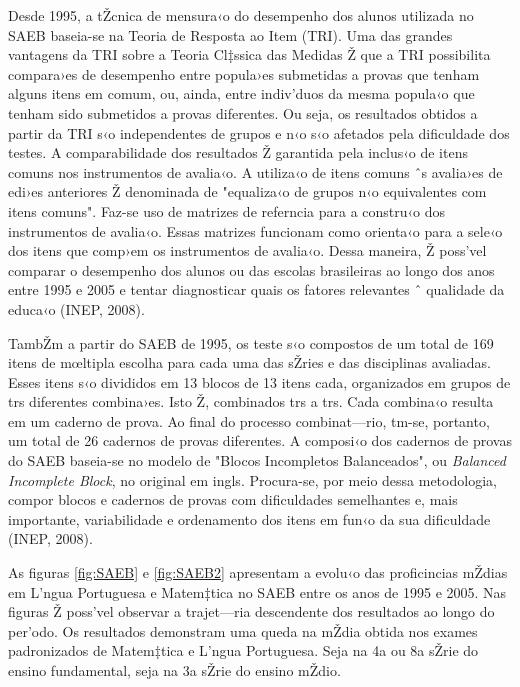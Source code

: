 \documentclass[a4paper, 12pt]{article}
\begin{document}
Desde 1995, a tŽcnica de mensura‹o do desempenho dos alunos utilizada no SAEB baseia-se na Teoria de Resposta ao Item (TRI). Uma das grandes vantagens da TRI sobre a Teoria Cl‡ssica das Medidas Ž que a TRI possibilita compara›es de desempenho entre popula›es submetidas a provas que tenham alguns itens em comum, ou, ainda, entre indiv’duos da mesma popula‹o que tenham sido submetidos a provas diferentes. Ou seja, os resultados obtidos a partir da TRI s‹o independentes de grupos e n‹o s‹o afetados pela dificuldade dos testes. A comparabilidade dos resultados Ž garantida pela inclus‹o de itens comuns nos instrumentos de avalia‹o. A utiliza‹o de itens comuns ˆs avalia›es de edi›es anteriores Ž denominada de "equaliza‹o de grupos n‹o equivalentes com itens comuns". Faz-se uso de matrizes de referncia para a constru‹o dos instrumentos de avalia‹o. Essas matrizes funcionam como orienta‹o para a sele‹o dos itens que comp›em os instrumentos de avalia‹o. Dessa maneira, Ž poss’vel comparar o desempenho dos alunos ou das escolas brasileiras ao longo dos anos entre 1995 e 2005 e tentar diagnosticar quais os fatores relevantes ˆ qualidade da educa‹o (INEP, 2008).

TambŽm a partir do SAEB de 1995, os teste s‹o compostos de um total de 169 itens de mœltipla escolha para cada uma das sŽries e das disciplinas avaliadas. Esses itens s‹o divididos em 13 blocos de 13 itens cada, organizados em grupos de trs diferentes combina›es. Isto Ž, combinados trs a trs. Cada combina‹o resulta em um caderno de prova. Ao final do processo combinat—rio, tm-se, portanto, um total de 26 cadernos de provas diferentes. A composi‹o dos cadernos de provas do SAEB baseia-se no modelo de "Blocos Incompletos Balanceados", ou \emph{Balanced Incomplete Block}, no original em ingls. Procura-se, por meio dessa metodologia, compor blocos e cadernos de provas com dificuldades semelhantes e, mais importante, variabilidade e ordenamento dos itens em fun‹o da sua dificuldade (INEP, 2008). 

As figuras  \ref{fig:SAEB} e \ref{fig:SAEB2} apresentam a evolu‹o das proficincias mŽdias em L’ngua Portuguesa e Matem‡tica no SAEB entre os anos de 1995 e 2005. Nas figuras Ž poss’vel observar a trajet—ria descendente dos resultados ao longo do per’odo. Os resultados demonstram uma queda na mŽdia obtida nos exames padronizados de Matem‡tica e L’ngua Portuguesa. Seja na 4a ou 8a sŽrie do ensino fundamental, seja na 3a sŽrie do ensino mŽdio.

\end{document}
